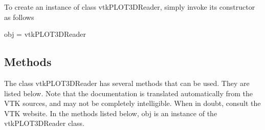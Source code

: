 To create an instance of class vtk\-P\-L\-O\-T3\-D\-Reader, simply invoke its constructor as follows \begin{DoxyVerb}  obj = vtkPLOT3DReader
\end{DoxyVerb}
 \hypertarget{vtkwidgets_vtkxyplotwidget_Methods}{}\subsection{Methods}\label{vtkwidgets_vtkxyplotwidget_Methods}
The class vtk\-P\-L\-O\-T3\-D\-Reader has several methods that can be used. They are listed below. Note that the documentation is translated automatically from the V\-T\-K sources, and may not be completely intelligible. When in doubt, consult the V\-T\-K website. In the methods listed below, {\ttfamily obj} is an instance of the vtk\-P\-L\-O\-T3\-D\-Reader class. 
